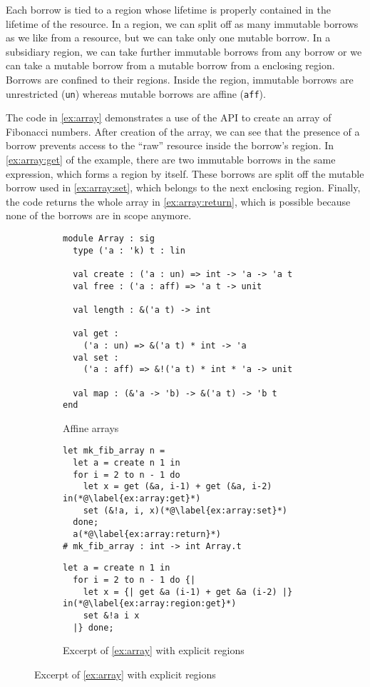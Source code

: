 Each borrow is tied to a region whose lifetime is properly
contained in the lifetime of the resource. 
In a region, we can split off as many immutable borrows as we like
from a resource, but we can take only one mutable borrow. In a
subsidiary region, we can take further immutable borrows from any
borrow or we can take a mutable borrow from a mutable borrow from a
enclosing region. Borrows are confined to their regions. Inside the region,
immutable borrows are unrestricted (\lstinline/un/) whereas mutable
borrows are affine (\lstinline/aff/).

The code in \cref{ex:array} demonstrates a use of the API to create an
array of Fibonacci numbers. After creation of the array, we can see
that the presence of a borrow prevents access to the ``raw'' 
resource inside the borrow's region. In \cref{ex:array:get} of the
example, there are two immutable borrows in the same
expression, which forms a region by itself. These borrows are split
off the mutable borrow used in \cref{ex:array:set}, which belongs to
the next enclosing region.
Finally, the code returns the whole array in \cref{ex:array:return},
which is possible because none of the borrows are in scope anymore.

\begin{figure}[tp]
  \centering
  \begin{subfigure}[t]{0.47\linewidth}
\begin{lstlisting}
module Array : sig
  type ('a : 'k) t : lin
  
  val create : ('a : un) => int -> 'a -> 'a t
  val free : ('a : aff) => 'a t -> unit

  val length : &('a t) -> int

  val get :
    ('a : un) => &('a t) * int -> 'a
  val set :
    ('a : aff) => &!('a t) * int * 'a -> unit
  
  val map : (&'a -> 'b) -> &('a t) -> 'b t
end
\end{lstlisting}
    \caption{Affine arrays}
    \label{sig:array}
  \end{subfigure}\hfill
  \begin{subfigure}[t]{0.53\linewidth}
\begin{lstlisting}
let mk_fib_array n =
  let a = create n 1 in
  for i = 2 to n - 1 do
    let x = get (&a, i-1) + get (&a, i-2) in(*@\label{ex:array:get}*)
    set (&!a, i, x)(*@\label{ex:array:set}*)
  done;
  a(*@\label{ex:array:return}*)
# mk_fib_array : int -> int Array.t
\end{lstlisting}
    \caption{Example of use of affine arrays}
    \label{ex:array}
\begin{lstlisting}[firstnumber=2]
  let a = create n 1 in
  for i = 2 to n - 1 do {|
    let x = {| get &a (i-1) + get &a (i-2) |} in(*@\label{ex:array:region:get}*)
    set &!a i x
  |} done;
\end{lstlisting}
    \caption{Excerpt of \cref{ex:array} with explicit regions}
    \label{ex:array:region}
  \end{subfigure}
\end{figure}

